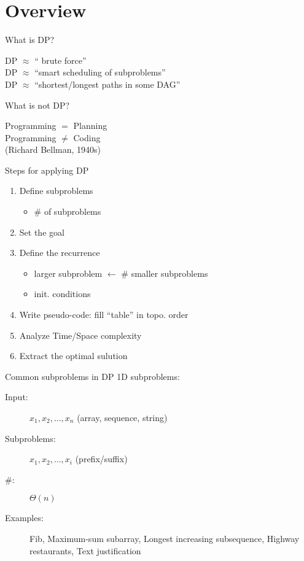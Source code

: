 \section{Overview}

\begin{frame}{What is DP?}
  \begin{center}
	DP $\approx$ `` brute force'' \\
	DP $\approx$ ``smart scheduling of subproblems'' \\
	DP $\approx$ ``shortest/longest paths in some DAG''
  \end{center}
\end{frame}
\begin{frame}{What is not DP?}
  \begin{center}
	Programming $=$ Planning \\[15pt] \pause
	Programming $\neq$ Coding \\[5pt]
	(Richard Bellman, 1940s)
  \end{center}
\end{frame}
\begin{frame}{Steps for applying DP}
  \begin{enumerate}
	\item Define subproblems
	  \begin{itemize}
		\item \# of subproblems
	  \end{itemize}
	\item Set the goal
	\item Define the recurrence
	  \begin{itemize}
		\item larger subproblem $\gets$ \# smaller subproblems
		\item init. conditions
	  \end{itemize}
	\item Write pseudo-code: fill ``table'' in topo. order
	\item Analyze Time/Space complexity
	\item Extract the optimal sulution
  \end{enumerate}
\end{frame}
\begin{frame}{Common subproblems in DP}
  1D subproblems:
  \begin{description}
	\item[Input:] $x_1, x_2, \dots, x_n$ (array, sequence, string)
	\item[Subproblems:] $x_1, x_2, \dots, x_i$ (prefix/suffix)
	\item[\#:] $\Theta(n)$
	  \pause
	\item[Examples:] Fib, Maximum-sum subarray, Longest increasing subsequence, Highway restaurants, Text justification
  \end{description}
\end{frame}
